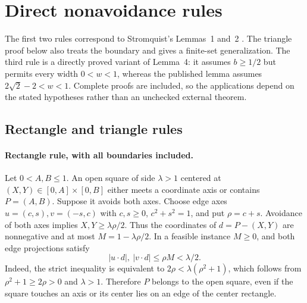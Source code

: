\documentclass[11pt]{article}
\begin{document}
\clearpage
\appendix


\section{Direct nonavoidance rules}\label{app:nonavoidance}
The first two rules correspond to Stromquist's Lemmas~1 and~2
\cite[ p.~2]{stromquist}. The triangle proof below also treats the boundary
and gives a finite-set generalization. The third rule is a directly proved variant of Lemma~4: it assumes
$b\ge1/2$ but permits every width $0<w<1$, whereas the published
lemma assumes $2\sqrt2-2<w<1$. Complete proofs are included, so the applications
depend on the stated hypotheses rather than an unchecked external theorem.

\subsection{Rectangle and triangle rules}
\paragraph{Rectangle rule, with all boundaries included.}
Let $0<A,B\le1$. An open square of side $\lambda>1$ centered at
$(X,Y)\in[0,A]\times[0,B]$ either meets a coordinate axis or contains
$P=(A,B)$. Suppose it avoids both axes. Choose edge axes
$u=(c,s),v=(-s,c)$ with $c,s\ge0$, $c^2+s^2=1$, and put $\rho=c+s$.
Avoidance of both axes implies $X,Y\ge\lambda\rho/2$. Thus the
coordinates of $d=P-(X,Y)$ are nonnegative and at most
$M=1-\lambda\rho/2$. In a feasible instance $M\ge0$, and both edge
projections satisfy
\[
 |u\cdot d|,\ |v\cdot d|\le\rho M<\lambda/2.
\]
Indeed, the strict inequality is equivalent to
$2\rho<\lambda(\rho^2+1)$, which follows from
$\rho^2+1\ge2\rho>0$ and $\lambda>1$. Therefore $P$ belongs to the
open square, even if the square touches an axis or its center lies on
an edge of the center rectangle.
\end{document}
